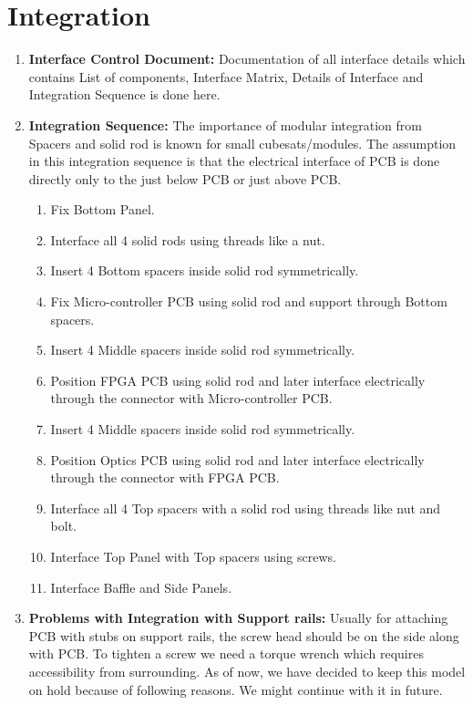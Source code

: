 \documentclass[../../main.tex]{subfiles}
\begin{document}
\section{Integration}
\begin{enumerate}
    \item \textbf{Interface Control Document:} Documentation of all interface details which contains List of components, Interface Matrix, Details of Interface and Integration Sequence is done here.
    \item \textbf{Integration Sequence:} The importance of modular integration from Spacers and solid rod is known for small cubesats/modules. The assumption in this integration sequence is that the electrical interface of PCB is done directly only to the just below PCB or just above PCB.
    \begin{enumerate}
        \item Fix Bottom Panel.
        \item Interface all 4 solid rods using threads like a nut.
        \item Insert 4 Bottom spacers inside solid rod symmetrically.
        \item Fix Micro-controller PCB using solid rod and support through Bottom spacers.
        \item Insert 4 Middle spacers inside solid rod symmetrically.
        \item Position FPGA PCB using solid rod and later interface electrically through the connector with Micro-controller PCB.
        \item Insert 4 Middle spacers inside solid rod symmetrically.
        \item Position Optics PCB using solid rod and later interface electrically through the connector with FPGA PCB.
        \item Interface all 4 Top spacers with a solid rod using threads like nut and bolt.
        \item Interface Top Panel with Top spacers using screws.
        \item Interface Baffle and Side Panels.
    \end{enumerate}
    \item \textbf{Problems with Integration with Support rails:} Usually for attaching PCB with stubs on support rails, the screw head should be on the side along with PCB. To tighten a screw we need a torque wrench which requires accessibility from surrounding. As of now, we have decided to keep this model on hold because of following reasons. We might continue with it in future.

\end{enumerate}
\end{document}
